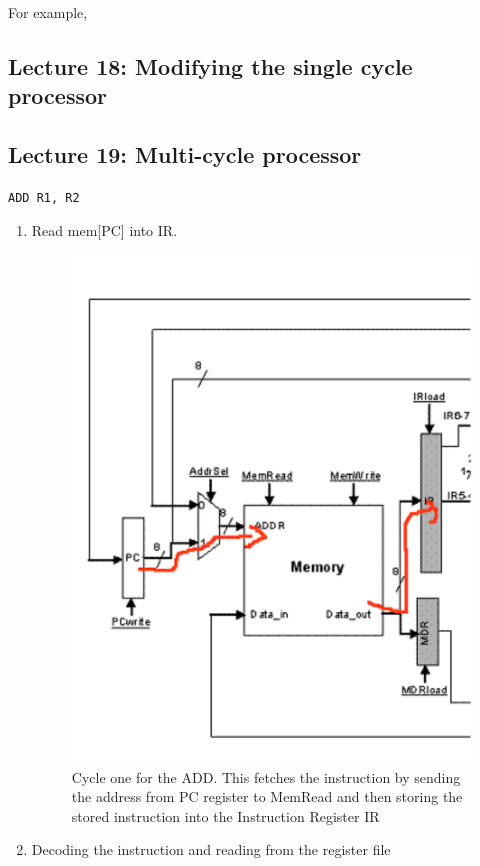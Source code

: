 \documentclass[../notes.tex]{subfiles}
\begin{document}
For example, 




\subsection{Lecture 18: Modifying the single cycle processor}
\subsection{Lecture 19: Multi-cycle processor}


\texttt{ADD R1, R2}


\begin{enumerate}
	\item Read mem[PC] into IR.

\begin{figure}[H]
	\centering
	\includegraphics[width=0.8\linewidth]{img/image_2022-11-03-13-24-33.png}
	\caption{Cycle one for the ADD. This fetches the instruction by sending the address from PC register to MemRead and then storing the stored instruction into the Instruction Register IR}
\end{figure}

\item Decoding the instruction and reading from the register file



\end{enumerate}
\end{document}

